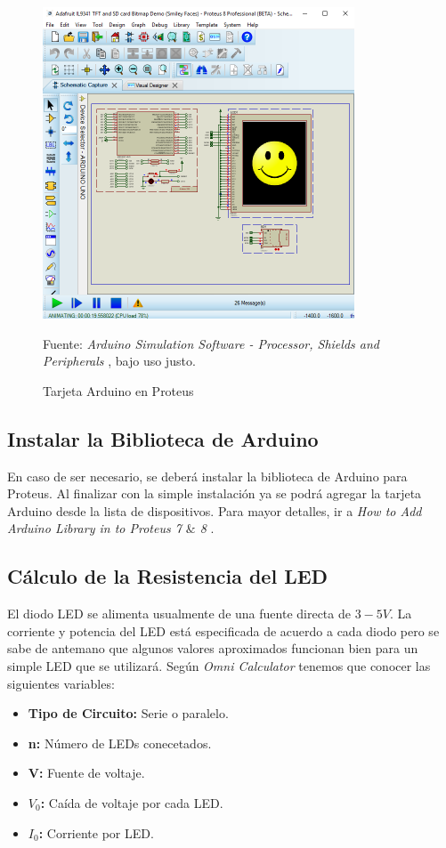 \documentclass{article}
\begin{document}
\begin{figure}[H]
    \centering
    \includegraphics[width=0.3\paperwidth]{images/schematic.png}
    \caption{Tarjeta Arduino en Proteus}\footnotesize
    Fuente: \textit{Arduino Simulation Software - Processor, Shields and Peripherals} \cite{labcenter-electronics-2022}, bajo uso justo.
\end{figure}

\subsection{Instalar la Biblioteca de Arduino}

En caso de ser necesario, se deberá instalar la biblioteca de Arduino para Proteus. Al finalizar con la simple instalación ya se podrá agregar la tarjeta Arduino desde la lista de dispositivos. Para mayor detalles, ir a \textit{How to Add Arduino Library in to Proteus 7 $\&$ 8} \cite{instructables-2018}.

\subsection{Cálculo de la Resistencia del LED}

El diodo LED se alimenta usualmente de una fuente directa de $3-5V$. La corriente y potencia del LED está especificada de acuerdo a cada diodo pero se sabe de antemano que algunos valores aproximados funcionan bien para un simple LED que se utilizará. Según \textit{Omni Calculator} \cite{szyk-2022} tenemos que conocer las siguientes variables:

\begin{itemize}
    \item \textbf{Tipo de Circuito:} Serie o paralelo.
    \item \textbf{n:} Número de LEDs conecetados.
    \item \textbf{V:} Fuente de voltaje.
    \item \textbf{$V_0$:} Caída de voltaje por cada LED.
    \item \textbf{$I_0$:} Corriente por LED.
\end{itemize}
\end{document}
